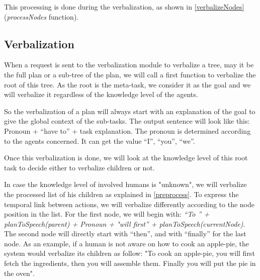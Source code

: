 \documentclass{llncs}
\begin{document}

This processing is done during the verbalization, as shown in \ref{verbalizeNodes} (\textit{processNodes} function).


\subsection{Verbalization}

When a request is sent to the verbalization module to verbalize a tree, may it be the full plan or a sub-tree of the plan, we will call a first function to verbalize the root of this tree. As the root is the meta-task, we consider it as the goal and we will verbalize it regardless of the knowledge level of the agents.

So the verbalization of a plan will always start with an explanation of the goal to give the global context of the sub-tasks.
The output sentence will look like this:
Pronoun + ``have to'' + task explanation.
The pronoun is determined according to the agents concerned. It can get the value ``I'', ``you'', ``we''.

Once this verbalization is done, we will look at the knowledge level of this root task to decide either to verbalize children or not.





In case the knowledge level of involved humans is "unknown", we will verbalize the processed list of his children as explained in \ref{preprocess}.
To express the temporal link between actions, we will verbalize differently according to the node position in the list.
For the first node, we will begin with: \textit{``To '' + planToSpeech(parent) + Pronoun +  "will first'' + planToSpeech(currentNode)}. The second node will directly start with ``then'', and with ``finally'' for the last node.
As an example, if a human is not aware on how to cook an apple-pie, the system would verbalize its children as follow:
"To cook an apple-pie, you will first fetch the ingredients, then you will  assemble them. Finally you will put the pie in the oven".
\end{document}
